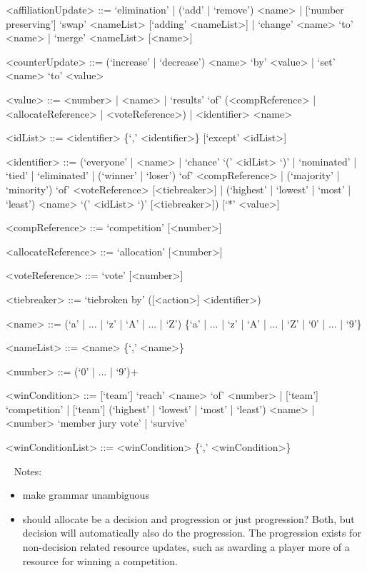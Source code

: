 \documentclass{article}
\begin{document}
\begin{grammar}
<affiliationUpdate> ::= `elimination' | (`add' | `remove') <name> | 
[`number preserving'] `swap' <nameList> [`adding' <nameList>] | `change' <name> 
`to' <name> | `merge' <nameList> [<name>]

<counterUpdate> ::= (`increase' | `decrease') <name> `by' <value> | `set' 
<name> `to' <value> 

<value> ::= <number> | <name> | `results' `of' (<compReference> | 
<allocateReference> |
<voteReference>) | <identifier> <name> %

<idList> ::= <identifier> \{`,' <identifier>\} [`except' <idList>]

<identifier> ::= (`everyone' | <name> | `chance' `(' <idList> `)' | `nominated' 
| 
`tied' | 
`eliminated' | (`winner' | `loser') `of' <compReference> | (`majority' | 
`minority') `of' <voteReference>  [<tiebreaker>] | (`highest' | `lowest' | 
`most' | `least') <name> `(' <idList> `)' [<tiebreaker>])
[`*' <value>]

<compReference> ::= `competition' [<number>] 

<allocateReference> ::= `allocation' [<number>]

<voteReference> ::= `vote' [<number>]

<tiebreaker> ::= `tiebroken by' ([<action>] <identifier>)

<name> ::= (`a' | ... | `z' | `A' | ... | `Z') \{`a' | ... | `z' | `A' | ... | 
`Z' | `0' | ... | `9'\}

<nameList> ::= <name> \{`,' <name>\}

<number> ::= (`0' | ... | `9')+

<winCondition> ::= [`team'] `reach' <name> `of' <number> | [`team'] 
`competition' | [`team'] (`highest' | `lowest' | `most' | `least') <name> | 
<number> `member jury vote' | `survive'

<winConditionList> ::= <winCondition> \{`,' <winCondition>\}

\end{grammar}

~\newline
Notes:
\begin{itemize}
	\item make grammar unambiguous
	\item should allocate be a decision and progression or just progression? 
	Both, but decision will automatically also do the progression. The 
	progression exists for non-decision related resource updates, such as 
	awarding a player more of a resource for winning a competition.
\end{itemize}
\end{document}
